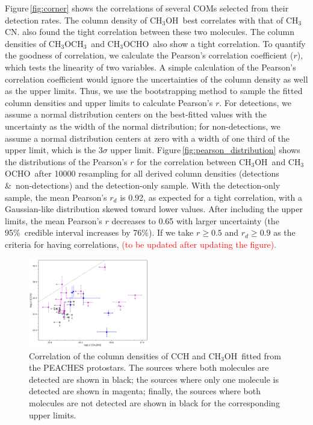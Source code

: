\documentclass[twocolumn]{aastex62}
\newcommand{\methylformate}{\mbox{CH$_{3}$OCHO}}
\newcommand{\methanol}{\mbox{CH$_{3}$OH}}
\newcommand{\dimethylether}{\mbox{CH$_{3}$OCH$_{3}$}}
\newcommand{\methylcyanide}{\mbox{CH$_{3}$CN}}
\begin{document}
Figure\,\ref{fig:corner} shows the correlations of several COMs selected from their detection rates.  The column density of \methanol\ best correlates with that of \methylcyanide.  \citet{2020A&A...635A.198B} also found the tight correlation between these two molecules.  The column densities of \dimethylether\ and \methylformate\ also show a tight correlation.  To quantify the goodness of correlation, we calculate the Pearson's correlation coefficient ($r$), which tests the linearity of two variables.  A simple calculation of the Pearson's correlation coefficient would ignore the uncertainties of the column density as well as the upper limits.  Thus, we use the bootstrapping method to sample the fitted column densities and upper limits to calculate Pearson's $r$.  For detections, we assume a normal distribution centers on the best-fitted values with the uncertainty as the width of the normal distribution; for non-detections, we assume a normal distribution centers at zero with a width of one third of the upper limit, which is the 3$\sigma$ upper limit.  Figure\,\ref{fig:pearson_distribution} shows the distributions of the Pearson's $r$ for the correlation between \methanol\ and \methylformate\ after 10000 resampling for all derived column densities (detections \&\ non-detections) and the detection-only sample.  With the detection-only sample, the mean Pearson's $r_{d}$ is 0.92, as expected for a tight correlation, with a Gaussian-like distribution skewed toward lower values.  After including the upper limits, the mean Pearson's $r$ decreases to 0.65 with larger uncertainty (the 95\%\ credible interval increases by 76\%).  If we take $r \geq 0.5$ and $r_{d} \geq 0.9$ as the criteria for having correlations, \textcolor{red}{(to be updated after updating the figure).}  

\begin{figure}[htbp!]
  \centering
  \includegraphics[width=0.47\textwidth]{Ncol_ch3oh_cch.pdf}
  \caption{Correlation of the column densities of CCH and \methanol\ fitted from the PEACHES protostars.  The sources where both molecules are detected are shown in black; the sources where only one molecule is detected are shown in magenta; finally, the sources where both molecules are not detected are shown in black for the corresponding upper limits.}
  \label{fig:cch_ch3oh}
\end{figure}
\end{document}
